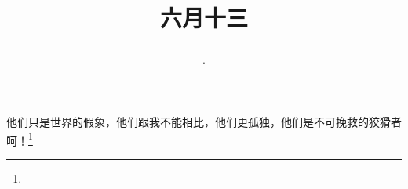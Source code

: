 \title{\date[d=18,m=7,y=2024][year:cn-y,年,month:cn,day:cn,日,·,weekday]·六月十三 }
他们只是世界的假象，他们跟我不能相比，他们更孤独，他们是不可挽救的狡猾者呵！\footnote{ }

